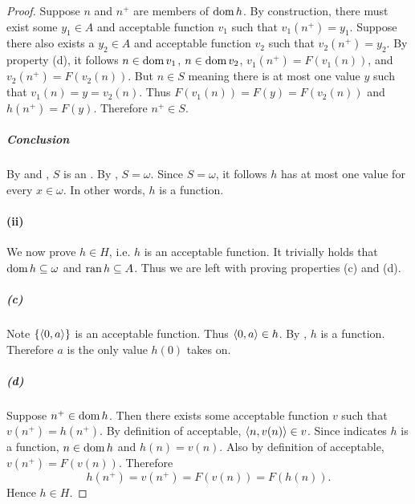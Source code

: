\documentclass{report}
\begin{document}
\begin{proof}
        Suppose $n$ and $n^+$ are members of $\mathop{\text{dom}}{h}$.
        By construction, there must exist some $y_1 \in A$ and acceptable
          function $v_1$ such that $v_1(n^+) = y_1$.
        Suppose there also exists a $y_2 \in A$ and acceptable function $v_2$
          such that $v_2(n^+) = y_2$.
        By property (d), it follows $n \in \mathop{\text{dom}}{v_1}$, $n \in \mathop{\text{dom}}{v_2}$,
          $v_1(n^+) = F(v_1(n))$, and $v_2(n^+) = F(v_2(n))$.
        But $n \in S$ meaning there is at most one value $y$ such that
          $v_1(n) = y = v_2(n)$.
        Thus $F(v_1(n)) = F(y) = F(v_2(n))$ and $h(n^+) = F(y)$.
        Therefore $n^+ \in S$.

      \subparagraph{Conclusion}%

        By  and
          , $S$ is an
          .
        By , $S = \omega$.
        Since $S = \omega$, it follows $h$ has at most one value for every
          $x \in \omega$.
        In other words, $h$ is a function.

    \paragraph{(ii)}%

      We now prove $h \in H$, i.e. $h$ is an acceptable function.
      It trivially holds that $\mathop{\text{dom}}{h} \subseteq \omega$ and
        $\mathop{\text{ran}}{h} \subseteq A$.
      Thus we are left with proving properties (c) and (d).

      \subparagraph{(c)}%

        Note $\{\left< 0, a \right>\}$ is an acceptable function.
        Thus $\left< 0, a \right> \in h$.
        By , $h$ is a function.
        Therefore $a$ is the only value $h(0)$ takes on.

      \subparagraph{(d)}%

        Suppose $n^+ \in \mathop{\text{dom}}{h}$.
        Then there exists some acceptable function $v$ such that
          $v(n^+) = h(n^+)$.
        By definition of acceptable, $\left< n, v(n) \right> \in v$.
        Since  indicates $h$ is
          a function, $n \in \mathop{\text{dom}}{h}$ and $h(n) = v(n)$.
        Also by definition of acceptable, $v(n^+) = F(v(n))$.
        Therefore $$h(n^+) = v(n^+) = F(v(n)) = F(h(n)).$$
        Hence $h \in H$.


\end{proof}
\end{document}

